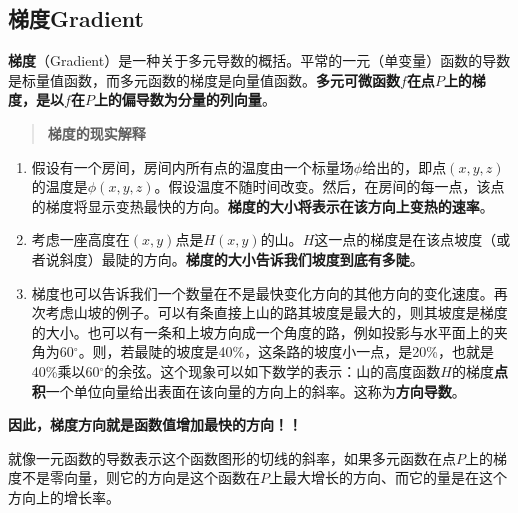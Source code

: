 \documentclass[UTF8]{ctexart}
\begin{document}
{\subsection{梯度Gradient}
\textbf{梯度}（Gradient）是一种关于多元导数的概括。平常的一元（单变量）函数的导数是标量值函数，而多元函数的梯度是向量值函数。\textbf{多元可微函数$f$在点$P$上的梯度，是以$f$在$P$上的偏导数为分量的列向量}。
\begin{quote}
\centering
\textbf{梯度的现实解释}
\end{quote}

\begin{enumerate}
	\item 假设有一个房间，房间内所有点的温度由一个标量场$\phi$给出的，即点$(x,y,z)$的温度是$\phi(x,y,z)$。假设温度不随时间改变。然后，在房间的每一点，该点的梯度将显示变热最快的方向。\textbf{梯度的大小将表示在该方向上变热的速率}。
	\item 考虑一座高度在$(x, y)$点是$H(x, y)$的山。$H$这一点的梯度是在该点坡度（或者说斜度）最陡的方向。\textbf{梯度的大小告诉我们坡度到底有多陡}。
	\item 梯度也可以告诉我们一个数量在不是最快变化方向的其他方向的变化速度。再次考虑山坡的例子。可以有条直接上山的路其坡度是最大的，则其坡度是梯度的大小。也可以有一条和上坡方向成一个角度的路，例如投影与水平面上的夹角为60$^\circ$。则，若最陡的坡度是40\%，这条路的坡度小一点，是20\%，也就是40\%乘以60$^\circ$的余弦。这个现象可以如下数学的表示：山的高度函数$H$的梯度\textbf{点积}一个单位向量给出表面在该向量的方向上的斜率。这称为\textbf{方向导数}。
\end{enumerate}
\textbf{因此，梯度方向就是函数值增加最快的方向！！}
\begin{info}[Notice:]
	就像一元函数的导数表示这个函数图形的切线的斜率，如果多元函数在点$P$上的梯度不是零向量，则它的方向是这个函数在$P$上最大增长的方向、而它的量是在这个方向上的增长率。
\end{info}

}
\end{document}
